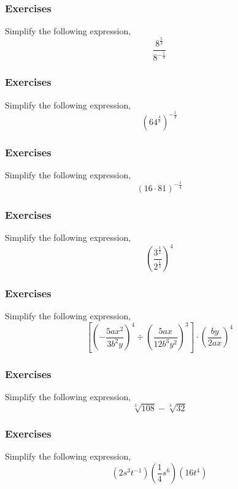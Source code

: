 \documentclass[xcolor=dvipsnames]{beamer}
\begin{document}
\begin{frame}
  \frametitle{Exercises}
{\ubung} Simplify the following expression,
\begin{equation}
  \label{eq:ungeipau}
  \frac{8^{\frac{5}{3}}}{8^{-\frac{1}{3}}}
\end{equation}
\end{frame}

\begin{frame}
  \frametitle{Exercises}
{\ubung} Simplify the following expression,
\begin{equation}
  \label{eq:zaiquahu}
  \left(64^{\frac{4}{3}}\right)^{-\frac{1}{2}}
\end{equation}
\end{frame}

\begin{frame}
  \frametitle{Exercises}
{\ubung} Simplify the following expression,
\begin{equation}
  \label{eq:uobeigha}
  (16\cdot{}81)^{-\frac{1}{4}}
\end{equation}
\end{frame}

\begin{frame}
  \frametitle{Exercises}
{\ubung} Simplify the following expression,
\begin{equation}
  \label{eq:neeshaej}
  \left(\frac{3^{\frac{1}{2}}}{2^{\frac{1}{3}}}\right)^{4}
\end{equation}
\end{frame}

\begin{frame}
  \frametitle{Exercises}
{\ubung} Simplify the following expression,
\begin{equation}
  \label{eq:phiuchai}
\left[\left(-\frac{5ax^{2}}{3b^{2}y}\right)^{4}\div\left(\frac{5ax}{12b^{3}y^{2}}\right)^{3}\right]\cdot\left(\frac{by}{2ax}\right)^{4}
\end{equation}
\end{frame}

\begin{frame}
  \frametitle{Exercises}
{\ubung} Simplify the following expression,
\begin{equation}
  \label{eq:taejahbo}
\sqrt[3]{108}-\sqrt[3]{32}
\end{equation}
\end{frame}

\begin{frame}
  \frametitle{Exercises}
{\ubung} Simplify the following expression,
\begin{equation}
  \label{eq:aineivee}
(2s^{3}t^{-1})\left(\frac{1}{4}s^{6}\right)(16t^{4})
\end{equation}
\end{frame}
\end{document}

